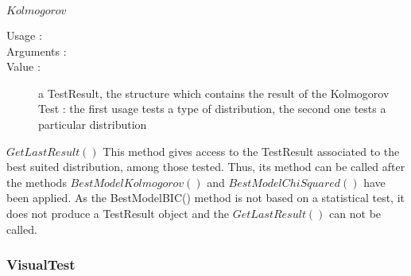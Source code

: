 \begin{description}
\begin{description}
  \item $Kolmogorov$
    \begin{description}
    \item[Usage :] \rule{0pt}{1em}
    \item[Arguments :] \rule{0pt}{1em}
    \item[Value :]  a TestResult, the structure which contains the result of the Kolmogorov Test : the first usage tests a type of distribution, the second one tests a particular distribution
    \end{description}

  \item $GetLastResult()$ This method gives access to the  TestResult associated to the best suited distribution, among those tested. Thus, its method can be called after the methods  $BestModelKolmogorov()$ and  $BestModelChiSquared()$ have been applied. As the BestModelBIC() method is not based on a statistical test, it does not produce a TestResult object and the $GetLastResult()$ can not be called.

  \end{description}

\end{description}

\newpage         \subsubsection{VisualTest} \label{visualtest}


